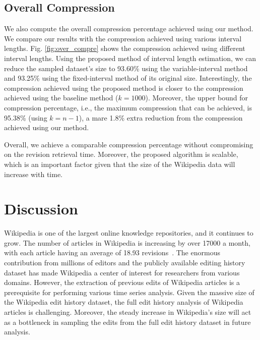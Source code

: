 \documentclass[acmsmall]{acmart}
\begin{document}
\subsection{Overall Compression}
We also compute the overall compression percentage achieved using our method. We compare our results with the compression achieved using various interval lengths. Fig. \ref{fig:over_compre} shows the compression achieved using different interval lengths. Using the proposed method of interval length estimation, we can reduce the sampled dataset's size to 93.60\% using the variable-interval method and 93.25\% using the fixed-interval method of its original size. Interestingly, the compression achieved using the proposed method is closer to the compression achieved using the baseline method ($k = 1000$). Moreover, the upper bound for compression percentage, i.e., the maximum compression that can be achieved, is 95.38\% (using $k = n-1$), a mare 1.8\% extra reduction from the compression achieved using our method.

Overall, we achieve a comparable compression percentage without compromising on the revision retrieval time. Moreover, the proposed algorithm is scalable, which is an important factor given that the size of the Wikipedia data will increase with time.



\section{Discussion}
Wikipedia is one of the largest online knowledge repositories, and it continues to grow. The number of articles in Wikipedia is increasing by over 17000 a month, with each article having an average of 18.93 revisions~\cite{wiki_stats}. The enormous contribution from millions of editors and the publicly available editing history dataset has made Wikipedia a center of interest for researchers from various domains. However, the extraction of previous edits of Wikipedia articles is a prerequisite for performing various time series analysis. Given the massive size of the Wikipedia edit history dataset, the full edit history analysis of Wikipedia articles is challenging. Moreover, the steady increase in Wikipedia's size will act as a bottleneck in sampling the edits from the full edit history dataset in future analysis.
\end{document}
